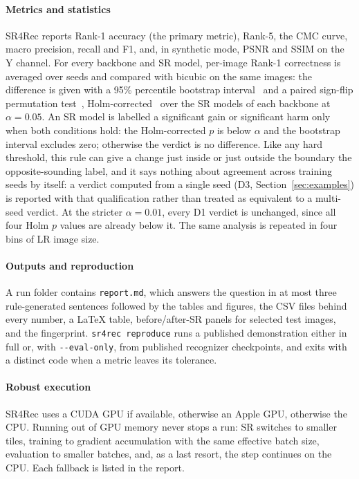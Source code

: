 \documentclass[preprint,12pt]{elsarticle}
\begin{document}
\paragraph{Metrics and statistics} SR4Rec reports Rank-1 accuracy (the primary metric), Rank-5, the
CMC curve, macro precision, recall and F1, and, in synthetic mode, PSNR and SSIM on the Y channel.
For every backbone and SR model, per-image Rank-1 correctness is averaged over seeds and compared
with bicubic on the same images: the difference is given with a 95\% percentile bootstrap
interval~\cite{efron1993bootstrap} and a paired sign-flip permutation test~\cite{good2005permutation},
Holm-corrected~\cite{holm1979} over the SR models of each backbone at $\alpha = 0.05$. An SR model
is labelled a significant gain or significant harm only when both conditions hold: the
Holm-corrected $p$ is below $\alpha$ and the bootstrap interval excludes zero; otherwise the
verdict is no difference. Like any hard threshold, this rule can give a change just inside or just
outside the boundary the opposite-sounding label, and it says nothing about agreement across
training seeds by itself: a verdict computed from a single seed (D3, Section~\ref{sec:examples}) is
reported with that qualification rather than treated as equivalent to a multi-seed verdict. At the
stricter $\alpha = 0.01$, every D1 verdict is unchanged, since all four Holm $p$ values are already
below it. The same analysis is repeated in four bins of LR image size.

\paragraph{Outputs and reproduction} A run folder contains \texttt{report.md}, which answers the
question in at most three rule-generated sentences followed by the tables and figures, the CSV files
behind every number, a \LaTeX{} table, before/after-SR panels for selected test images, and the
fingerprint. \texttt{sr4rec reproduce} runs a published demonstration either in full or, with
\texttt{-{}-eval-only}, from published recognizer checkpoints, and exits with a distinct code when a
metric leaves its tolerance.

\paragraph{Robust execution} SR4Rec uses a CUDA GPU if available, otherwise an Apple GPU, otherwise
the CPU. Running out of GPU memory never stops a run: SR switches to smaller tiles, training to
gradient accumulation with the same effective batch size, evaluation to smaller batches, and, as a
last resort, the step continues on the CPU. Each fallback is listed in the report.
\end{document}

